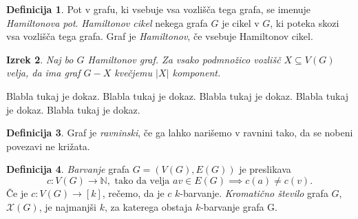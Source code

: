 \documentclass[12pt,a4paper]{amsart}
\theoremstyle{definition} %
\newtheorem{definicija}{Definicija}[section]
\theoremstyle{plain} %
\newtheorem{izrek}[definicija]{Izrek}
\newcommand{\N}{\mathbb N}
\newcommand{\graf}[1]{\ensuremath{#1 = (V(#1), E(#1))}}
\begin{document}
\begin{definicija}
	Pot v grafu, ki vsebuje vsa vozlišča tega grafa, se imenuje \emph{Hamiltonova pot}.
	\emph{Hamiltonov cikel} nekega grafa $G$ je cikel v $G$, ki poteka skozi vsa vozlišča tega grafa.
	Graf je \emph{Hamiltonov}, če vsebuje Hamiltonov cikel.
\end{definicija}

\begin{izrek}
	Naj bo $G$ Hamiltonov graf. Za vsako podmnožico vozlišč $X \subseteq V(G)$ velja, da ima graf $G - X$ kvečjemu $|X|$ komponent.
\end{izrek}

\proof
	Blabla tukaj je dokaz. Blabla tukaj je dokaz. Blabla tukaj je dokaz. Blabla tukaj je dokaz. Blabla tukaj je dokaz.
\endproof

\begin{definicija}
	Graf je \emph{ravninski}, če ga lahko narišemo v ravnini tako, da se nobeni povezavi ne križata.
\end{definicija}

\begin{definicija}
	\emph{Barvanje} grafa $\graf{G}$ je preslikava 
	\[ c\colon V(G) \longrightarrow \N, \text{ tako da velja } av \in E(G) \implies c(a) \neq c(v). \]
	Če je $c\colon V(G) \longrightarrow [k]$, rečemo, da je $c$ $k$-barvanje. \emph{Kromatično število} grafa $G$, $\mathcal{X}(G)$, je najmanjši $k$, za katerega obstaja $k$-barvanje grafa G.
\end{definicija}

\begin{thebibliography}{99}


\end{thebibliography}
\end{document}
